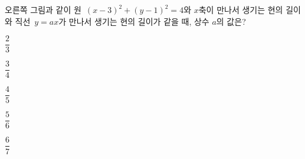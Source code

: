 \noindent\begin{minipage}[t]{0.58\linewidth}\vspace{0pt}\raggedright 오른쪽 그림과 같이 원~$(x-3)^2+(y-1)^2=4$와 $x$축이 만나서 생기는 현의 길이와 직선~$y=ax$가 만나서 생기는 현의 길이가 같을 때, 상수 $a$의 값은? \end{minipage}\hfill\begin{minipage}[t]{0.4\linewidth}\vspace{0pt}\centering \resizebox{\ifdim\width>\linewidth\linewidth\else\width\fi}{!}{}\end{minipage}\par
\begin{choices32}{\rule[-3ex]{0pt}{8ex}$\dfrac{2}{3}$}{\rule[-3ex]{0pt}{8ex}$\dfrac{3}{4}$}{\rule[-3ex]{0pt}{8ex}$\dfrac{4}{5}$}{\rule[-3ex]{0pt}{8ex}$\dfrac{5}{6}$}{\rule[-3ex]{0pt}{8ex}$\dfrac{6}{7}$}\end{choices32}
